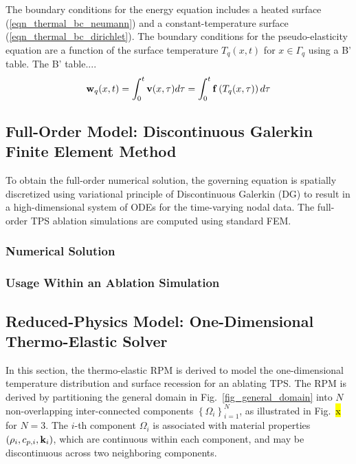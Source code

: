 The boundary conditions for the energy equation includes a heated surface (\cref{eqn_thermal_bc_neumann}) and a constant-temperature surface (\cref{eqn_thermal_bc_dirichlet}). The boundary conditions for the pseudo-elasticity equation are a function of the surface temperature $T_q(x,t)$ for $x\in\Gamma_q$ using a B' table. The B' table....
\begin{equation}
    \mathbf{w}_q(x,t) = \int_{0}^{t} \mathbf{v}(x,\tau)d\tau = \int_{0}^{t}\mathbf{f}\left(T_q(x,\tau)\right)d\tau\label{eqn_boundary_displacement}
\end{equation}


\subsection{Full-Order Model: Discontinuous Galerkin Finite Element Method}

To obtain the full-order numerical solution, the governing equation is spatially discretized using variational principle of Discontinuous Galerkin (DG) to result in a high-dimensional system of ODEs for the time-varying nodal data. The full-order TPS ablation simulations are computed using standard FEM.

\subsubsection{Numerical Solution}

\subsubsection{Usage Within an Ablation Simulation}


\subsection{Reduced-Physics Model: One-Dimensional Thermo-Elastic Solver}

In this section, the thermo-elastic RPM is derived to model the one-dimensional temperature distribution and surface recession for an ablating TPS. The RPM is derived by partitioning the general domain in Fig.~\ref{fig_general_domain} into $N$ non-overlapping inter-connected components $\left\{\Omega_i\right\}_{i=1}^{N}$, as illustrated in Fig.~\hl{x} for $N=3$. The $i$-th component $\Omega_i$ is associated with material properties $\left(\rho_i, c_{p,i}, \mathbf{k}_i\right)$, which are continuous within each component, and may be discontinuous across two neighboring components.


